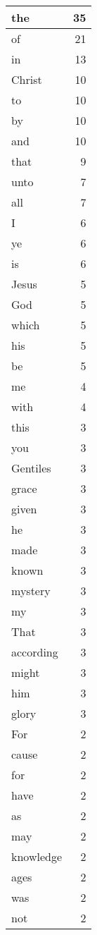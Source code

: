 \begin{center}
\begin{longtable}{l|r}
the & 35\\ \hline 
of & 21\\ \hline 
in & 13\\ \hline 
Christ & 10\\ \hline 
to & 10\\ \hline 
by & 10\\ \hline 
and & 10\\ \hline 
that & 9\\ \hline 
unto & 7\\ \hline 
all & 7\\ \hline 
I & 6\\ \hline 
ye & 6\\ \hline 
is & 6\\ \hline 
Jesus & 5\\ \hline 
God & 5\\ \hline 
which & 5\\ \hline 
his & 5\\ \hline 
be & 5\\ \hline 
me & 4\\ \hline 
with & 4\\ \hline 
this & 3\\ \hline 
you & 3\\ \hline 
Gentiles & 3\\ \hline 
grace & 3\\ \hline 
given & 3\\ \hline 
he & 3\\ \hline 
made & 3\\ \hline 
known & 3\\ \hline 
mystery & 3\\ \hline 
my & 3\\ \hline 
That & 3\\ \hline 
according & 3\\ \hline 
might & 3\\ \hline 
him & 3\\ \hline 
glory & 3\\ \hline 
For & 2\\ \hline 
cause & 2\\ \hline 
for & 2\\ \hline 
have & 2\\ \hline 
as & 2\\ \hline 
may & 2\\ \hline 
knowledge & 2\\ \hline 
ages & 2\\ \hline 
was & 2\\ \hline 
not & 2\\ \hline 

\end{longtable}
\end{center}
